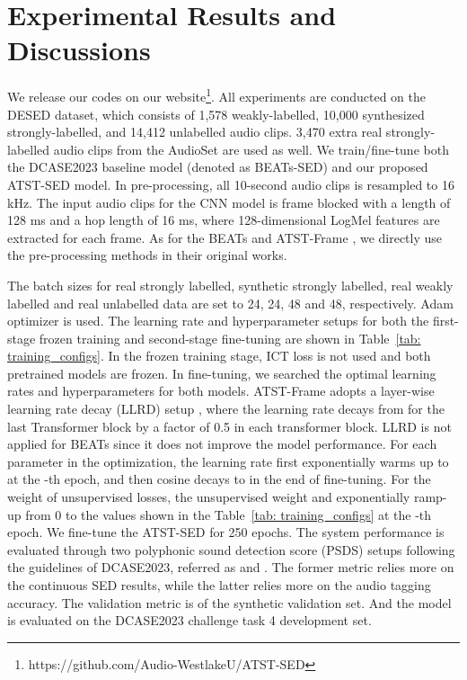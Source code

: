 \documentclass{article}
\begin{document}
\section{Experimental Results and Discussions}

We release our codes on our website\footnote{https://github.com/Audio-WestlakeU/ATST-SED}. All experiments are conducted on the DESED \cite{turpault2019sound} dataset, which consists of 1,578 weakly-labelled, 10,000 synthesized strongly-labelled, and 14,412 unlabelled audio clips. 3,470 extra real strongly-labelled audio clips from the AudioSet \cite{gemmeke2017audio} are used as well. We train/fine-tune both the DCASE2023 baseline model (denoted as BEATs-SED) and our proposed ATST-SED model. In pre-processing, all 10-second audio clips is resampled to 16 kHz. The input audio clips for the CNN model is frame blocked with a length of 128 ms and a hop length of 16 ms, where 128-dimensional LogMel features are extracted for each frame. As for the BEATs \cite{Chen2023BEATs} and ATST-Frame \cite{li2023self}, we directly use the pre-processing methods in their original works. 

The batch sizes for real strongly labelled, synthetic strongly labelled, real weakly labelled and real unlabelled data are set to 24, 24, 48 and 48, respectively. Adam optimizer \cite{kingma2015adam} is used. The learning rate and hyperparameter setups for both the first-stage frozen training and second-stage fine-tuning are shown in Table~\ref{tab: training_configs}. In the frozen training stage, ICT loss is not used and both pretrained models are frozen. In fine-tuning, we searched the optimal learning rates and hyperparameters for both models. ATST-Frame adopts a layer-wise learning rate decay (LLRD) setup \cite{bao2022beit, li2023self}, where the learning rate decays from  for the last Transformer block by a factor of 0.5 in each transformer block. LLRD is not applied for BEATs since it does not improve the model performance. For each parameter in the optimization, the learning rate first exponentially warms up to  at the -th epoch, and then cosine decays to  in the end of fine-tuning. For the weight of unsupervised losses, the unsupervised weight  and  exponentially ramp-up from 0 to the values shown in the Table~\ref{tab: training_configs} at the -th epoch. We fine-tune the ATST-SED for 250 epochs. The system performance is evaluated through two polyphonic sound detection score (PSDS) \cite{ebbers2022psds} setups following the guidelines of DCASE2023, referred as  and . The former metric relies more on the continuous SED results, while the latter relies more on the audio tagging accuracy. The validation metric is  of the synthetic validation set. And the model is evaluated on the DCASE2023 challenge task 4 development set.
\end{document}
